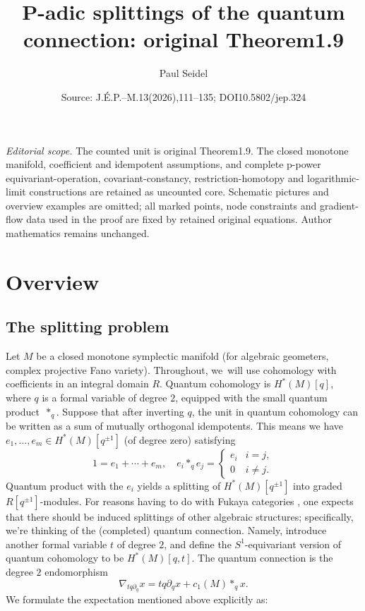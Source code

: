 \documentclass[10pt,a4paper]{amsart}
\title[P-adic quantum-connection splitting]{P-adic splittings of the quantum connection: original Theorem1.9}
\author{Paul Seidel}
\date{Source: J.\'E.P.--M.13(2026),111--135; DOI10.5802/jep.324}
\theoremstyle{plain}
\theoremstyle{definition}
\begin{document}
\maketitle
\noindent\textit{Editorial scope.} The counted unit is original Theorem1.9. The closed monotone manifold, coefficient and idempotent assumptions, and complete p-power equivariant-operation, covariant-constancy, restriction-homotopy and logarithmic-limit constructions are retained as uncounted core. Schematic pictures and overview examples are omitted; all marked points, node constraints and gradient-flow data used in the proof are fixed by retained original equations. Author mathematics remains unchanged.
\section{Overview\label{sec:overview}}

\subsection{The splitting problem}
Let $M$ be a closed monotone symplectic manifold (for algebraic geometers, complex projective Fano variety). Throughout, we~will use cohomology with coefficients in an integral domain $R$. Quantum cohomology is $H^*(M)[q]$, where $q$ is a formal variable of degree $2$, equipped with the small quantum product~$\ast_q$. Suppose that after inverting $q$, the unit in quantum cohomology can be written as a sum of mutually orthogonal idempotents. This means we have $e_1,\dots,e_m \in H^*(M)[q^{\pm 1}]$ (of degree zero) satisfying
\begin{equation} \label{eq:idempotents}
1 = e_1 + \cdots + e_m, \quad e_i \ast_q e_j = \begin{cases} e_i & i = j, \\ 0 & i \neq j.
\end{cases}
\end{equation}
Quantum product with the $e_i$ yields a splitting of $H^*(M)[q^{\pm 1}]$ into graded $R[q^{\pm 1}]$-modules. For reasons having to do with Fukaya categories \cite{hugtenburg24, chen24}, one expects that there should be induced splittings of other algebraic structures; specifically, we're thinking of the (completed) quantum connection. Namely, introduce another formal variable $t$ of degree $2$, and define the $S^1$-equivariant version of quantum cohomology to be $H^*(M)[q,t]$. The quantum connection is the degree $2$ endomorphism
\begin{equation*}
\nabla_{tq\partial_q} x = tq\partial_q x + c_1(M) \ast_q x.
\end{equation*}
We formulate the expectation mentioned above explicitly as:
\end{document}
